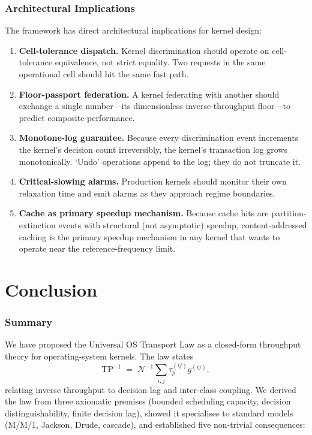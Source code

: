 \documentclass[twocolumn,11pt,a4paper]{article}
\newcommand{\TP}{\mathrm{TP}}
\newcommand{\taup}{\tau_p}
\newcommand{\Norm}{\mathcal{N}}
\begin{document}
\section{Architectural Implications}
\label{sec:architecture}

The framework has direct architectural implications for kernel design:

\begin{enumerate}[nosep,leftmargin=*]
\item \textbf{Cell-tolerance dispatch.} Kernel discrimination should operate on cell-tolerance equivalence, not strict equality. Two requests in the same operational cell should hit the same fast path.
\item \textbf{Floor-passport federation.} A kernel federating with another should exchange a single number---its dimensionless inverse-throughput floor---to predict composite performance.
\item \textbf{Monotone-log guarantee.} Because every discrimination event increments the kernel's decision count irreversibly, the kernel's transaction log grows monotonically. `Undo' operations append to the log; they do not truncate it.
\item \textbf{Critical-slowing alarms.} Production kernels should monitor their own relaxation time and emit alarms as they approach regime boundaries.
\item \textbf{Cache as primary speedup mechanism.} Because cache hits are partition-extinction events with structural (not asymptotic) speedup, content-addressed caching is the primary speedup mechanism in any kernel that wants to operate near the reference-frequency limit.
\end{enumerate}

\part{Conclusion}

\section{Summary}

We have proposed the Universal OS Transport Law as a closed-form throughput theory for operating-system kernels. The law states
\[
\TP^{-1} \;=\; \Norm^{-1}\sum_{i,j} \taup^{(ij)} g^{(ij)},
\]
relating inverse throughput to decision lag and inter-class coupling. We derived the law from three axiomatic premises (bounded scheduling capacity, decision distinguishability, finite decision lag), showed it specialises to standard models (M/M/1, Jackson, Drude, cascade), and established five non-trivial consequences:
\end{document}
